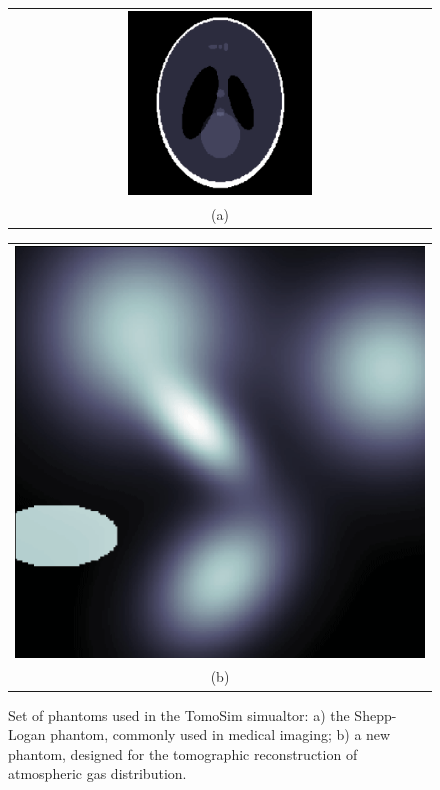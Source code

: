 \begin{figure}
   \centering 
   \begin{tabular}[b]{c}
      \includegraphics[width=0.45\textwidth]{img/png/shepp_logan.png}\\
      \small (a)
   \end{tabular}
   \hfill
   \begin{tabular}[b]{c}
       \includegraphics[width=.45\textwidth]{img/png/spectral.png}\label{fig:new_phantom}\\
      \small (b)
   \end{tabular}
   \caption{Set of phantoms used in the TomoSim simualtor: a) the
   Shepp-Logan phantom, commonly used in medical imaging; b) a new
   phantom, designed for the tomographic reconstruction of atmospheric
   gas distribution.}\label{fig:phantoms}
\end{figure}

